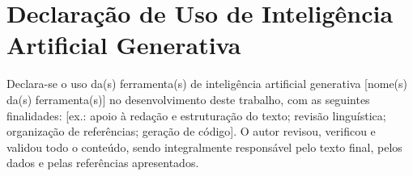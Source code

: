 \chapter*{Declaração de Uso de Inteligência Artificial Generativa}


Declara-se o uso da(s) ferramenta(s) de inteligência artificial generativa
[nome(s) da(s) ferramenta(s)] no desenvolvimento deste trabalho, com as
seguintes finalidades: [ex.: apoio à redação e estruturação do texto; revisão
linguística; organização de referências; geração de código]. O autor revisou,
verificou e validou todo o conteúdo, sendo integralmente responsável pelo texto
final, pelos dados e pelas referências apresentados.
